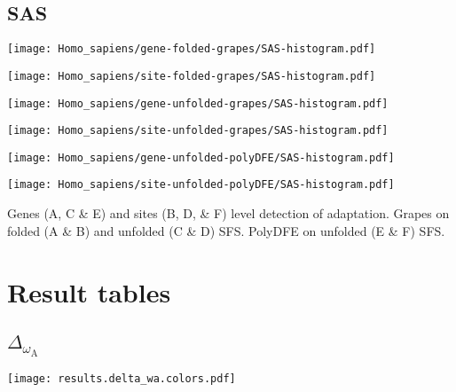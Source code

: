 \documentclass{article}
\begin{document}
\subsection{SAS}
\centering
\begin{minipage}{0.49\linewidth}
    \texttt{[image: Homo\_sapiens/gene-folded-grapes/SAS-histogram.pdf]}
\end{minipage}%
\hfill
\begin{minipage}{0.49\linewidth}
    \texttt{[image: Homo\_sapiens/site-folded-grapes/SAS-histogram.pdf]}
\end{minipage}
\hfill
\begin{minipage}{0.49\linewidth}
    \texttt{[image: Homo\_sapiens/gene-unfolded-grapes/SAS-histogram.pdf]}
\end{minipage}%
\hfill
\begin{minipage}{0.49\linewidth}
    \texttt{[image: Homo\_sapiens/site-unfolded-grapes/SAS-histogram.pdf]}
\end{minipage}
\hfill
\begin{minipage}{0.49\linewidth}
    \texttt{[image: Homo\_sapiens/gene-unfolded-polyDFE/SAS-histogram.pdf]}
\end{minipage}%
\hfill
\begin{minipage}{0.49\linewidth}
    \texttt{[image: Homo\_sapiens/site-unfolded-polyDFE/SAS-histogram.pdf]}
\end{minipage}
\hfill
\flushleft
Genes (A, C \& E) and sites (B, D, \& F) level detection of adaptation.
Grapes on folded (A \& B) and unfolded (C \& D) SFS.
PolyDFE on unfolded (E \& F) SFS.

\section{Result tables}

\subsection{$\Delta_{\omega_{\text{A}}}$}
\texttt{[image: results.delta\_wa.colors.pdf]}
\end{document}
